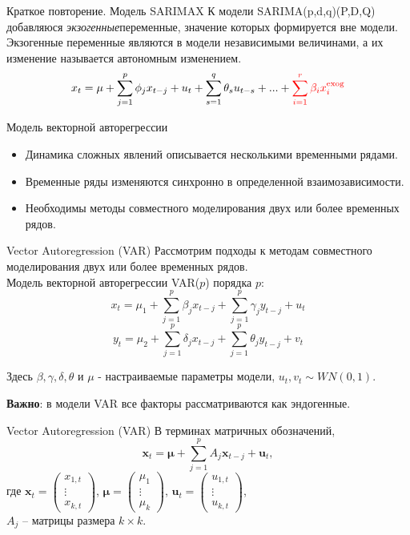 \begin{frame}{Краткое повторение. Модель SARIMAX}
К модели SARIMA(p,d,q)(P,D,Q) добавляюся \textit{экзогенные}переменные, значение которых формируется вне модели.
Экзогенные переменные являются в модели независимыми величинами, а их изменение называется автономным изменением.
\begin{equation*}
x_t = \mu + \sum_{j=1}^{p}\phi_j x_{t-j} + u_t + \sum_{s=1}^{q}\theta_s u_{t-s} +...+ \textcolor{red}{\sum_{i=1}^{r}\beta_i x^{\text{exog}}_i}
\end{equation*}

\end{frame}
\begin{frame}{Модель векторной авторегрессии}
    \begin{itemize}
    \item Динамика сложных явлений описывается несколькими временными рядами.
    \item Временные ряды изменяются синхронно в определенной взаимозависимости.
    \item Необходимы методы совместного моделирования двух или более временных рядов.
    \end{itemize}
\end{frame}
\begin{frame}{Vector Autoregression (VAR)}
Рассмотрим подходы к методам совместного моделирования двух или более временных рядов. \\
\vspace{0.2cm}
Модель векторной авторегрессии VAR($p$) порядка $p$:
$$ x_t = \mu_1 + \sum_{j=1}^p \beta_j x_{t-j} + \sum_{j=1}^p \gamma_j y_{t-j} + u_t$$
$$ y_t = \mu_2 + \sum_{j=1}^p \delta_j x_{t-j} + \sum_{j=1}^p \theta_j y_{t-j} + v_t$$

Здесь $\beta, \gamma, \delta, \theta$ и $\mu$ - настраиваемые параметры модели, $u_t, v_t \sim WN(0,1)$.

\textbf{Важно}: в модели VAR все факторы рассматриваются как эндогенные.
\end{frame}
\begin{frame}{Vector Autoregression (VAR)}
В терминах матричных обозначений,
$$ \mathbf{x}_t = \boldsymbol{\mu} + \sum_{j=1}^p A_j \mathbf{x}_{t-j} + \mathbf{u}_t,$$
где $\mathbf{x}_t = 
\begin{pmatrix}
x_{1,t} \\
\vdots \\
x_{k,t}
\end{pmatrix}
$, 
$\boldsymbol{\mu} = 
\begin{pmatrix}
\mu_1 \\
\vdots \\
\mu_k
\end{pmatrix}
$, 
$\mathbf{u}_t = 
\begin{pmatrix}
u_{1,t} \\
\vdots \\
u_{k,t}
\end{pmatrix}
$, \\ $A_j$ -- матрицы размера $k \times k$.
\end{frame}
